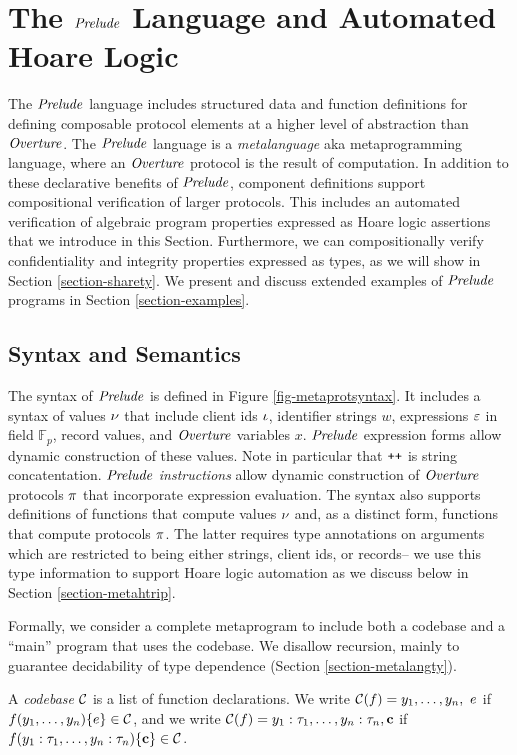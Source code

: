 \section{The $\mathit{Prelude}$ Language and Automated Hoare Logic}
\label{section-metalang}

The $\mathit{Prelude}$ language \cite{skalka-near-ppdp24} includes structured
data and function definitions for defining composable protocol
elements at a higher level of abstraction than $\mathit{Overture}$.  The
$\mathit{Prelude}$ language is a \emph{metalanguage} aka metaprogramming
language, where an $\mathit{Overture}$ protocol is the result of
computation. In addition to these declarative benefits of $\mathit{Prelude}$,
component definitions support compositional verification of larger
protocols. This includes an automated verification of algebraic
program properties expressed as Hoare logic assertions that we
introduce in this Section. Furthermore, we can compositionally verify
confidentiality and integrity properties expressed as types, as we
will show in Section \ref{section-sharety}. We present and discuss
extended examples of $\mathit{Prelude}$ programs in Section
\ref{section-examples}.

\metaprotsyntaxfig

\subsection{Syntax and Semantics}

The syntax of $\mathit{Prelude}$ is defined in Figure
\ref{fig-metaprotsyntax}.  It includes a syntax of values $\nu$ that
include client ids $\iota$, identifier strings $w$, expressions $\varepsilon$
in field $\mathbb{F}_p$, record values, and $\mathit{Overture}$ variables
$x$. $\mathit{Prelude}$ expression forms allow dynamic construction of these
values. Note in particular that $\texttt{++}$ is string concatentation.
$\mathit{Prelude}$ \emph{instructions} allow dynamic
construction of $\mathit{Overture}$ protocols $\pi$ that incorporate expression
evaluation. The syntax also supports definitions of functions that
compute values $\nu$ and, as a distinct form, functions that compute
protocols $\pi$.  The latter requires type annotations on arguments
which are restricted to being either strings, client ids, or
records-- we use this type information to support Hoare logic
automation as we discuss below in Section \ref{section-metahtrip}.

Formally, we consider a complete metaprogram to include
both a codebase and a ``main'' program that uses the codebase.
We disallow recursion, mainly to guarantee decidability
of type dependence (Section \ref{section-metalangty}).
\begin{definition}
A \emph{codebase} $\mathcal{C}$ is a list of function 
declarations. We write $ \mathcal{C}(f) = y_1,\ldots,y_n,\ e$
if $f(y_1,\ldots,y_n) \{ e \} \in \mathcal{C}$, and we
write  $ \mathcal{C}(f) = y_1 : \tau_1, \ldots, y_n : \tau_n, \mathbf{c}$
if $f(y_1 : \tau_1, \ldots, y_n : \tau_n) \{ \mathbf{c} \} \in \mathcal{C}$.
\end{definition}

